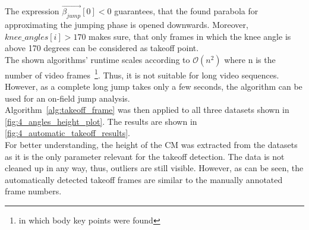 \noindent The expression \texttt{$\vec{\beta_{jump}}[0] < 0$} guarantees, that
the found parabola for approximating the jumping phase is opened downwards.
Moreover, \texttt{$knee\_angles[i] > 170$} makes sure, that only frames in
which the knee angle is above 170 degrees can be considered as takeoff point.\\
The shown algorithms' runtime scales according to $\mathcal{O}(n^2)$
where n is the number of video frames~\footnote{in which body key points were
found}. 
Thus, it is not suitable for long video sequences.
However, as a complete long jump takes only a few seconds, the algorithm can
be used for an on-field jump analysis.\\
Algorithm~\ref{alg:takeoff_frame} was then applied to all three datasets shown
in \autoref{fig:4_angles_height_plot}. 
The results are shown in \autoref{fig:4_automatic_takeoff_results}.\\
For better understanding, the height of the \ac{CM} was extracted from the
datasets as it is the only parameter relevant for the takeoff detection.
The data is not cleaned up in any way, thus, outliers are still
visible.
However, as can be seen, the automatically detected takeoff frames are
similar to the manually annotated frame numbers.
